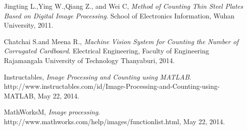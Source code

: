 \documentclass[11pt, oneside]{Thesis} %
\begin{document}

\mainmatter %

\pagestyle{fancy} %





 

 
 
 

 
 



\backmatter
\begin{thebibliography}{4} %
	Jingting L.,Ying W.,Qiang Z., and Wei C,
	\emph{Method of Counting Thin Steel
		Plates Based on Digital Image Processing}.
	School of Electronics Information, Wuhan University,
	2011.\label{ref:method}
	
	Chatchai S.and Meena R.,
	\emph{Machine Vision System for Counting the Number of
		Corrugated Cardboard}.
	Electrical Engineering, Faculty of Engineering
	Rajamangala University of Technology Thanyaburi,
	2014.\label{ref:machine}
	
	Instructables,
	\emph{Image Processing and Counting using MATLAB}.
	http://www.instructables.com/id/Image-Processing-and-Counting-using-
	MATLAB,
	May 22, 2014.
	
	MathWorksM,
	\emph{Image processing}.
	http://www.mathworks.com/help/images/functionlist.html,
	May 22, 2014.
	
\end{thebibliography}

%
\end{document}
